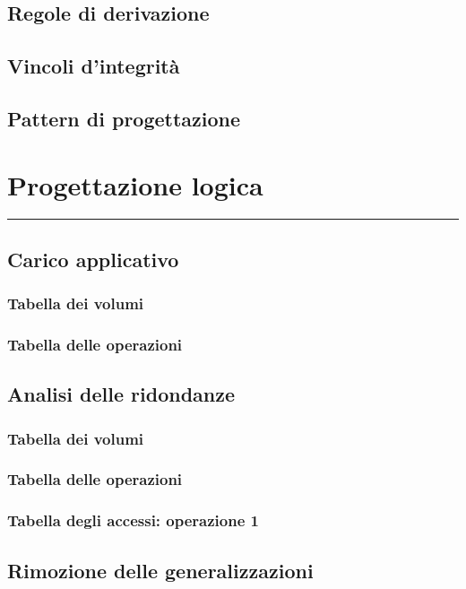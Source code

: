 \documentclass[legalpaper]{article}
\begin{document}
\subsection{Regole di derivazione}

\subsection{Vincoli d'integrità}

\subsection{Pattern di progettazione}

\newpage
\section{Progettazione logica}
\rule{\linewidth}{1.5pt}

\subsection{Carico applicativo}
\subsubsection{Tabella dei volumi}
\subsubsection{Tabella delle operazioni}

\subsection{Analisi delle ridondanze}
\subsubsection{Tabella dei volumi}
\subsubsection{Tabella delle operazioni}
\subsubsection{Tabella degli accessi: operazione 1}

\subsection{Rimozione delle generalizzazioni}
\end{document}
